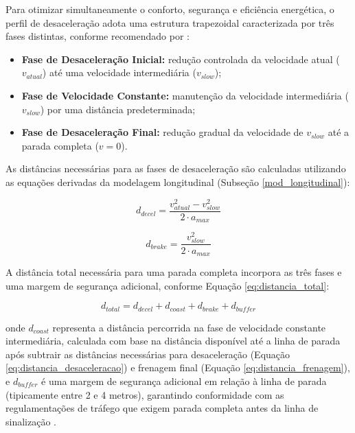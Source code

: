 \begin{enumerate}
    Para otimizar simultaneamente o conforto, segurança e eficiência energética, o perfil de desaceleração adota uma estrutura trapezoidal caracterizada por três fases distintas, conforme recomendado por :
    
    \begin{itemize}
        \item \textbf{Fase de Desaceleração Inicial:} redução controlada da velocidade atual ($v_{atual}$) até uma velocidade intermediária ($v_{slow}$);
        \item \textbf{Fase de Velocidade Constante:} manutenção da velocidade intermediária ($v_{slow}$) por uma distância predeterminada;
        \item \textbf{Fase de Desaceleração Final:} redução gradual da velocidade de $v_{slow}$ até a parada completa ($v = 0$).
    \end{itemize}
    
    As distâncias necessárias para as fases de desaceleração são calculadas utilizando as equações derivadas da modelagem longitudinal (Subseção \ref{mod_longitudinal}):
    
    \begin{equation}\label{eq:distancia_desaceleracao}
    d_{decel} = \frac{v_{atual}^2 - v_{slow}^2}{2 \cdot a_{max}}
    \end{equation}
    
    \begin{equation}\label{eq:distancia_frenagem}
    d_{brake} = \frac{v_{slow}^2}{2 \cdot a_{max}}
    \end{equation}
    
    A distância total necessária para uma parada completa incorpora as três fases e uma margem de segurança adicional, conforme Equação \ref{eq:distancia_total}:
    
    \begin{equation}\label{eq:distancia_total}
    d_{total} = d_{decel} + d_{coast} + d_{brake} + d_{buffer}
    \end{equation}
    
    onde $d_{coast}$ representa a distância percorrida na fase de velocidade constante intermediária, calculada com base na distância disponível até a linha de parada após subtrair as distâncias necessárias para desaceleração (Equação \ref{eq:distancia_desaceleracao}) e frenagem final (Equação \ref{eq:distancia_frenagem}), e $d_{buffer}$ é uma margem de segurança adicional em relação à linha de parada (tipicamente entre 2 e 4 metros), garantindo conformidade com as regulamentações de tráfego que exigem parada completa antes da linha de sinalização \cite{University_of_Toronto2018-mp}.
    

\end{enumerate}

